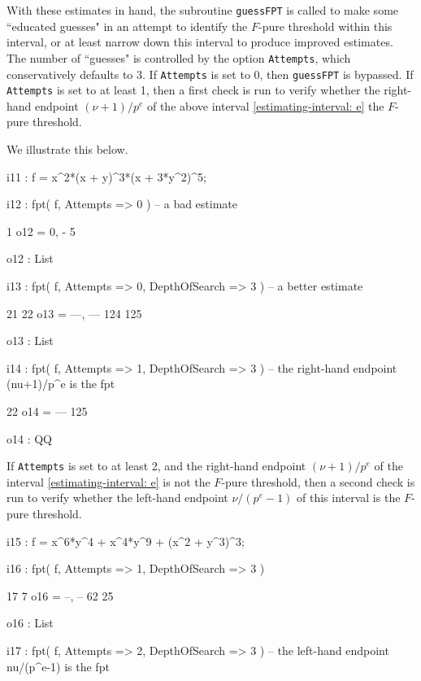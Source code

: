 \documentclass{amsart}
\begin{document}
With these estimates in hand, the subroutine {\tt guessFPT} is called to make some ``educated guesses" in an attempt to identify the $F$-pure threshold within this interval, or at least narrow down this interval to produce improved estimates.  The number of ``guesses" is controlled by the option {\tt Attempts}, which conservatively defaults to 3.  If {\tt Attempts} is set to 0, then {\tt guessFPT} is bypassed. If  {\tt Attempts} is set to at least 1, then a first check is run to verify whether the right-hand endpoint $(\nu+1)/p^e$ of the above interval \eqref{estimating-interval: e} the $F$-pure threshold.
 
 We illustrate this below.
 
{\small
{}
\begin{MyVerbatim}

i11 : f = x^2*(x + y)^3*(x + 3*y^2)^5;

i12 : fpt( f, Attempts => 0 ) -- a bad estimate

          1
o12 = {0, -}
          5

o12 : List

i13 : fpt( f, Attempts => 0, DepthOfSearch => 3 ) -- a better estimate

        21   22
o13 = {---, ---}
       124  125

o13 : List

i14 : fpt( f, Attempts => 1, DepthOfSearch => 3 ) -- the right-hand endpoint (nu+1)/p^e is the fpt

       22
o14 = ---
      125

o14 : QQ

\end{MyVerbatim}
 

If  {\tt Attempts} is set to at least 2, and the right-hand endpoint $(\nu+1)/p^e$ of the interval \eqref{estimating-interval: e} is not the $F$-pure threshold, then a second check is run to verify whether the left-hand endpoint $\nu/(p^e-1)$ of this interval is the $F$-pure threshold.

{\small
{}
\begin{MyVerbatim}

i15 : f = x^6*y^4 + x^4*y^9 + (x^2 + y^3)^3;

i16 : fpt( f, Attempts => 1, DepthOfSearch => 3 )

       17   7
o16 = {--, --}
       62  25

o16 : List

i17 : fpt( f, Attempts => 2, DepthOfSearch => 3 ) -- the left-hand endpoint nu/(p^e-1) is the fpt


\end{MyVerbatim}}}
\end{document}
